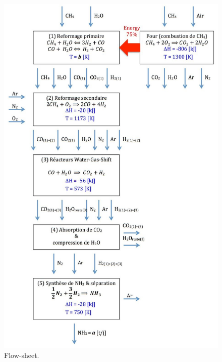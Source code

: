 \begin{figure}[ht!]
	\centering
	\includegraphics[scale=0.8]{media/flow-sheet-v2.jpg}
	\caption{Flow-sheet.}
	\label{fig:flow-sheet}
\end{figure}

